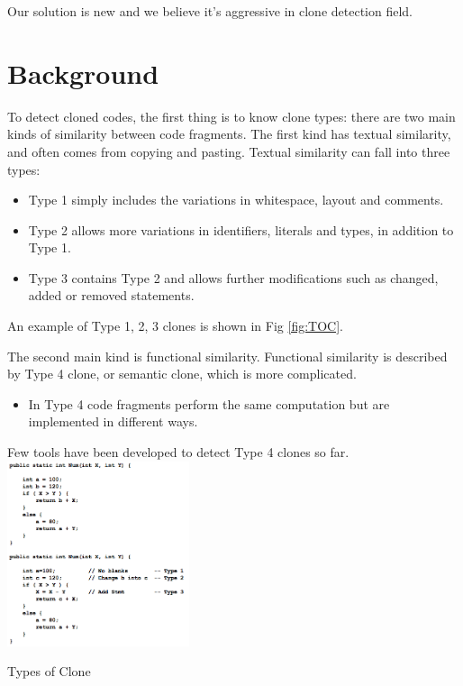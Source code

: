 \documentclass[conference]{IEEEtran}
\makeatletter
\newenvironment{figurehere}
  {\def\@captype{figure}}
  {}
\makeatother
\begin{document}
Our solution is new and we believe it's aggressive in clone detection field.


\section{Background}

To detect cloned codes, the first thing is to know clone types: there are two main kinds of similarity between code fragments. The first kind has textual similarity, and often comes from copying and pasting. Textual similarity can fall into three types: 
\begin{itemize}
\item Type 1 simply includes the variations in whitespace, layout and comments. 
\item Type 2 allows more variations in identifiers, literals and types, in addition to Type 1.
\item Type 3 contains Type 2 and allows further modifications such as changed, added or removed statements. 
\end{itemize}

An example of Type 1, 2, 3 clones is shown in Fig \ref{fig:TOC}. 

The second main kind is functional similarity. Functional similarity is described by Type 4 clone, or semantic clone, which is more complicated. 
\begin{itemize}
\item In Type 4 code fragments perform the same computation but are implemented in different ways. 
\end{itemize}

Few tools have been developed to detect Type 4 clones so far.\\


\begin{figurehere}
\centering \includegraphics[width=0.4\textwidth]{graph2_1} \caption{Types of Clone} \label{fig:TOC}
\end{figurehere}
\end{document}

